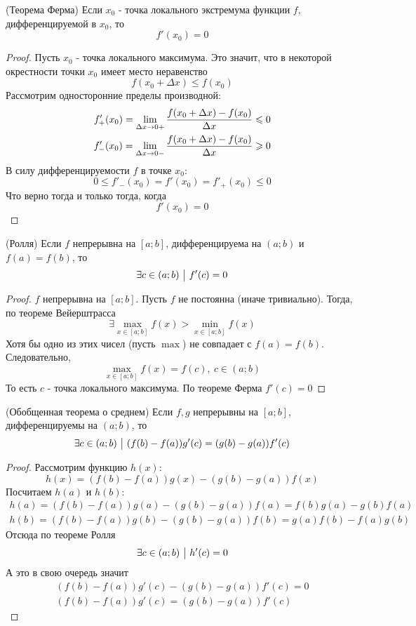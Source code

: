 \begin{theorem} (Теорема Ферма)
	Если $x_0$ - точка локального экстремума функции $f$, дифференцируемой в $x_0$, то
	\[
		f'(x_0) = 0
	\]
\end{theorem}

\begin{proof}
	Пусть $x_0$ - точка локального максимума. Это значит, что в некоторой окрестности точки $x_0$ имеет место неравенство
	\[
		f(x_0 + \Delta x) \le f(x_0)
	\]
	Рассмотрим односторонние пределы производной:
	\begin{align*}
		f'_+(x_0) = \lim\limits_{\Delta x \to 0+} \frac{f(x_0 + \Delta x) - f(x_0)}{\Delta x} \leqslant 0
		\\
		f'_-(x_0) = \lim\limits_{\Delta x \to 0-} \frac{f(x_0 + \Delta x) - f(x_0)}{\Delta x} \geqslant 0
	\end{align*}
	В силу дифференцируемости $f$ в точке $x_0$:
	\[
		0 \le f'_-(x_0) = f'(x_0) = f'_+(x_0) \le 0
	\]
	Что верно тогда и только тогда, когда
	\[
		f'(x_0) = 0
	\]
\end{proof}

\begin{theorem} (Ролля)
	Если $f$ непрерывна на $[a; b]$, дифференцируема на $(a; b)$ и $f(a) = f(b)$, то
	\[
		\exists c \in (a; b) \ \big|\  f'(c) = 0
	\]
\end{theorem}

\begin{proof}
	$f$ непрерывна на $[a; b]$. Пусть $f$ не постоянна (иначе тривиально). Тогда, по теореме Вейерштрасса
	\[
		\exists \max\limits_{x \in [a; b]} f(x) > \min\limits_{x \in [a; b]} f(x)
	\]
	Хотя бы одно из этих чисел (пусть $\max$) не совпадает с $f(a) = f(b)$. Следовательно,
	\[
		\max\limits_{x \in [a; b]} f(x) = f(c),\ c \in (a; b)
	\]
	То есть $c$ - точка локального максимума. По теореме Ферма $f'(c) = 0$
\end{proof}

\begin{theorem} (Обобщенная теорема о среднем) \label{common_mid}
	Если $f, g$ непрерывны на $[a; b]$, дифференцируемы на $(a; b)$, то
	\[
		\exists c \in (a; b) \ \big|\  (f(b) - f(a))g'(c) = (g(b) - g(a))f'(c)
	\]
\end{theorem}

\begin{proof}
	Рассмотрим функцию $h(x)$:
	\[
		h(x) = (f(b) - f(a))g(x) - (g(b) - g(a))f(x)
	\]
	Посчитаем $h(a)$ и $h(b)$:
	\begin{align*}
		h(a) = (f(b) - f(a))g(a) - (g(b) - g(a))f(a) = f(b)g(a) - g(b)f(a)
		\\
		h(b) = (f(b) - f(a))g(b) - (g(b) - g(a))f(b) = g(a)f(b) - f(a)g(b)
	\end{align*}
	Отсюда по теореме Ролля
	\[
		\exists c \in (a; b) \ \big|\  h'(c) = 0
	\]
	А это в свою очередь значит
	\begin{align*}
		(f(b) - f(a))g'(c) - (g(b) - g(a))f'(c) = 0
		\\
		(f(b) - f(a))g'(c) = (g(b) - g(a))f'(c)
	\end{align*}
\end{proof}

